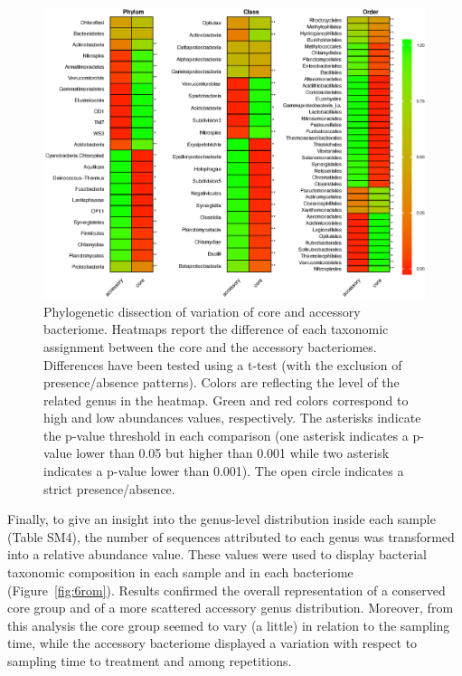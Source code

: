 \begin{figure}[!tb]
	\centering
	\includegraphics[width=1\textwidth]{./figures/Chapter_3/Fig5.eps}
  	\caption{Phylogenetic dissection of variation of core and accessory bacteriome. Heatmaps report the difference of each taxonomic assignment between the core and the accessory bacteriomes. Differences have been tested using a t-test (with the exclusion of presence/absence patterns). Colors are reflecting the level of the related genus in the heatmap. Green and red colors correspond to high and low abundances values, respectively. The asterisks indicate the p-value threshold in each comparison (one asterisk indicates a p-value lower than 0.05 but higher than 0.001 while two asterisk indicates a p-value lower than 0.001). The open circle indicates a strict presence/absence. \label{fig:5rom}}
\end{figure}
Finally, to give an insight into the genus-level distribution inside each sample (Table SM4), the number of sequences attributed to each genus was transformed into a relative abundance value. These values were used to display bacterial taxonomic composition in each sample and in each bacteriome (Figure~\ref{fig:6rom}). Results confirmed the overall representation of a conserved core group and of a more scattered accessory genus distribution. Moreover, from this analysis the core group seemed to vary (a little) in relation to the sampling time, while the accessory bacteriome displayed a variation with respect to sampling time to treatment and among repetitions.\\
